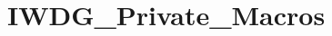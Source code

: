 \hypertarget{group___i_w_d_g___private___macros}{}\section{I\+W\+D\+G\+\_\+\+Private\+\_\+\+Macros}
\label{group___i_w_d_g___private___macros}
